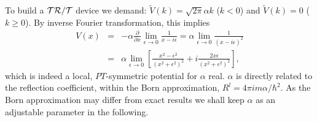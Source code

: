 To build a ${\cal{TR/T}}$ device we demand:
$\widetilde V(k) = \sqrt{2\pi} \alpha k$ ($k < 0$) and $\widetilde V(k) = 0$ ($k \ge 0$).
By inverse Fourier transformation, this implies
%
\begin{eqnarray}
  V(x) &=&
  -\alpha \frac{\partial}{\partial x} \lim_{\epsilon\to 0} \frac{1}{x - i \epsilon}
  = \alpha \lim_{\epsilon\to 0} \frac{1}{(x - i \epsilon)^2}
  \nonumber\\
  &=& \alpha \lim_{\epsilon\to 0} \left[\frac{x^2 - \epsilon^2}{(x^2 + \epsilon^2)^2} + i
  \frac{2 x\epsilon}{(x^2 + \epsilon^2)^2}\right],
  \label{num}
\end{eqnarray}
%
which is indeed a local, $PT$-symmetric potential for $\alpha$ real.
$\alpha$ is directly related to the reflection coefficient, within the Born approximation,
$R^l = 4 \pi i m \alpha/\hbar^2$. As the Born approximation may differ from exact results
we shall keep $\alpha$ as an adjustable parameter
in the following.


